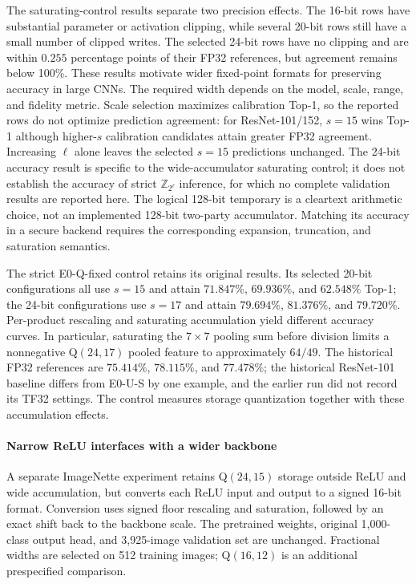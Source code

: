 \documentclass[journal]{IEEEtran}
\theoremstyle{definition}
\theoremstyle{plain}
\begin{document}
The saturating-control results separate two precision effects. The 16-bit rows have substantial
parameter or activation clipping, while several 20-bit rows still have a small
number of clipped writes. The selected 24-bit rows have no clipping and are
within $0.255$ percentage points of their FP32 references, but agreement remains
below 100\%. These results motivate wider fixed-point formats for preserving
accuracy in large CNNs. The required width depends on the model, scale, range,
and fidelity metric. Scale selection maximizes calibration Top-1, so the
reported rows do not optimize prediction
agreement: for ResNet-101/152, $s=15$ wins Top-1 although higher-$s$
calibration candidates attain greater FP32 agreement. Increasing $\ell$ alone
leaves the selected $s=15$ predictions unchanged. The 24-bit accuracy result
is specific to the wide-accumulator saturating control; it does not establish
the accuracy of strict $\mathbb Z_{2^\ell}$ inference, for which no complete
validation results are reported here. The logical 128-bit temporary is a
cleartext arithmetic choice, not an implemented 128-bit two-party accumulator.
Matching its accuracy in a secure backend requires the corresponding expansion,
truncation, and saturation semantics.



The strict E0-Q-fixed control retains its original results. Its selected
20-bit configurations all use $s=15$ and attain $71.847\%$, $69.936\%$, and
$62.548\%$ Top-1; the 24-bit configurations use $s=17$ and attain
$79.694\%$, $81.376\%$, and $79.720\%$. Per-product rescaling and
saturating accumulation yield different accuracy curves. In particular,
saturating the $7\times7$ pooling sum before division limits a nonnegative
Q$(24,17)$ pooled feature to approximately $64/49$. The historical FP32
references are $75.414\%$, $78.115\%$, and $77.478\%$; the historical
ResNet-101 baseline differs from E0-U-S by one example, and the earlier run did
not record its TF32 settings. The control measures storage quantization together with these
accumulation effects.

\paragraph*{Narrow ReLU interfaces with a wider backbone}
A separate ImageNette experiment retains Q$(24,15)$ storage outside ReLU and
wide accumulation, but converts each ReLU input and output to a signed 16-bit
format. Conversion uses signed floor rescaling and saturation, followed by an
exact shift back to the backbone scale. The pretrained weights, original
1,000-class output head, and 3,925-image validation set are unchanged.
Fractional widths are selected on 512 training images; Q$(16,12)$ is an
additional prespecified comparison.
\end{document}
